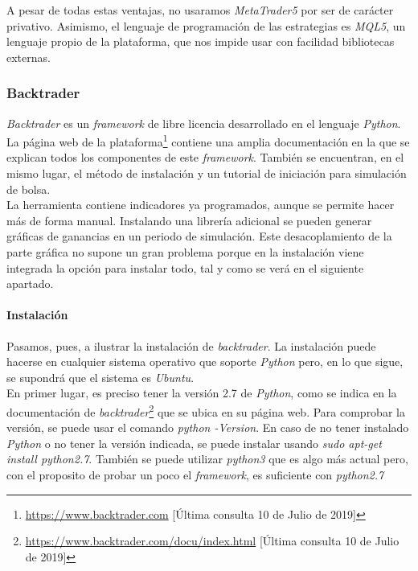 		A pesar de todas estas ventajas, no usaramos \textit{MetaTrader5} por ser de car\'acter privativo. Asimismo, el lenguaje de programaci\'on de las estrategias es \textit{MQL5}, un lenguaje propio de la plataforma, que nos impide usar con facilidad bibliotecas externas.\\
	
		\subsubsection{Backtrader}\label{sec:backtrader}
		
		\textit{Backtrader} es un \textit{framework} de libre licencia desarrollado en el lenguaje \textit{Python}. La p\'agina web de la plataforma\footnote{\url{https://www.backtrader.com} [\'Ultima consulta 10 de Julio de 2019]} contiene una amplia documentaci\'on en la que se explican todos los componentes de este \textit{framework}. Tambi\'en se encuentran, en el mismo lugar, el m\'etodo de instalaci\'on y un tutorial de iniciaci\'on para simulaci\'on de bolsa.\\
		
		La herramienta contiene indicadores ya programados, aunque se permite hacer m\'as de forma manual.  Instalando una librer\'ia adicional se pueden generar gr\'aficas de ganancias en un periodo de simulaci\'on. Este desacoplamiento de la parte gr\'afica no supone un gran problema porque en la instalaci\'on viene integrada la opci\'on para instalar todo, tal y como se ver\'a en el siguiente apartado.\\
		
		
		\paragraph{Instalaci\'on}\label{sec:install}
		
		Pasamos, pues, a ilustrar la instalaci\'on de \textit{backtrader}. La instalaci\'on puede hacerse en cualquier sistema operativo que soporte \textit{Python} pero, en lo que sigue, se supondr\'a que el sistema es \textit{Ubuntu}.\\
		
		En primer lugar, es preciso tener la versi\'on 2.7 de \textit{Python}, como se indica en la documentaci\'on de \textit{backtrader}\footnote{\url{https://www.backtrader.com/docu/index.html} [\'Ultima consulta 10 de Julio de 2019]} que se ubica en su p\'agina web. Para comprobar la versi\'on, se puede usar el comando \textit{python -Version}. En caso de no tener instalado \textit{Python} o no tener la versi\'on indicada, se puede instalar usando \textit{sudo apt-get install python2.7}. Tambi\'en se puede utilizar \textit{python3} que es algo m\'as actual pero, con el proposito de probar un poco el \textit{framework}, es suficiente con \textit{python2.7}\\
		
